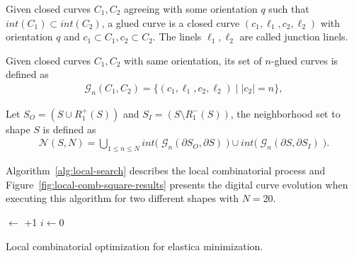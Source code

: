 \documentclass[smallextended]{svjour3}       %
\begin{document}
\begin{definition}
Given closed curves $C_1,C_2$ agreeing with some orientation $q$ such that $int(C_1) \subset int(C_2)$, a glued curve is a closed curve  $(c_1,\ell_1,c_2,\ell_2)$ with orientation $q$ and $c_1 \subset C_1, c_2 \subset C_2$. The linels $\ell_1,\ell_2$ are called junction linels.
\end{definition}



\begin{definition}
Given closed curves $C_1,C_2$ with same orientation, its set of $n$-glued curves is defined as
\begin{align*}
	\mathcal{G}_n(C_1,C_2) = \{ (c_1,\ell_1,c_2,\ell_2) \; | \; |c_2|=n \},
\end{align*}
\end{definition}



Let $S_O = ( S \cup R_1^+(S) ) $ and $S_I = ( S \setminus R_1^-(S) ) $, the neighborhood set to shape $S$ is defined as
\begin{align*}
	\mathcal{N}(S,N) = \bigcup_{1 \leq n \leq N} int \big(\; \mathcal{G}_{n}( \partial S_O, \partial S) \; \big) \cup int \big( \; \mathcal{G}_{n}(\partial S, \partial S_I) \; \big).
\end{align*}

Algorithm~\ref{alg:local-search} describes the local combinatorial process and Figure~\ref{fig:local-comb-square-results} presents the digital curve evolution when executing this algorithm for two different shapes with $N=20$.


\begin{algorithm}
 
 \BlankLine
 \Delta $\longleftarrow$ \Tol+1\;
 $i \longleftarrow 0$\;
 \caption{Local combinatorial optimization for elastica minimization.}
 \label{alg:local-search} 
\end{algorithm}
\end{document}
